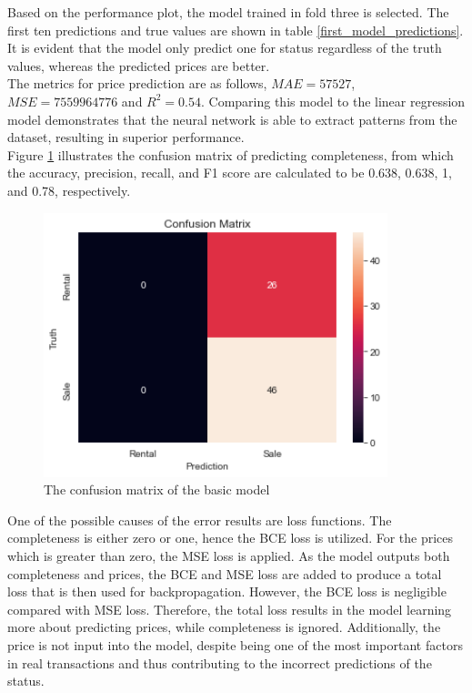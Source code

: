 \documentclass[12pt,twoside]{report}
\begin{document}
Based on the performance plot, the model trained in fold three is selected. The first ten predictions and true values are shown in table \ref{first_model_predictions}. It is evident that the model only predict one for status regardless of the truth values, whereas the predicted prices are better.  
\\

The metrics for price prediction are as follows, $MAE = 57527$, $MSE = 7559964776$ and $R^2 = 0.54$. Comparing this model to the linear regression model demonstrates that the neural network is able to extract patterns from the dataset, resulting in superior performance. 
\\

Figure \ref{confusion_matrix_basic_model} illustrates the confusion matrix of predicting completeness, from which the accuracy, precision, recall, and F1 score are calculated to be 0.638, 0.638, 1, and 0.78, respectively. 
\\

\begin{figure}[!htbp]
	\centering
	\includegraphics[width=10cm]{confusion_matrix_basic_model}
	\caption{The confusion matrix of the basic model}
	\label{confusion_matrix_basic_model}
\end{figure}

One of the possible causes of the error results are loss functions. The completeness is either zero or one, hence the BCE loss is utilized. For the prices which is greater than zero, the MSE loss is applied. As the model outputs both completeness and prices, the BCE and MSE loss are added to produce a total loss that is then used for backpropagation. However, the BCE loss is negligible compared with MSE loss. Therefore, the total loss results in the model learning more about predicting prices, while completeness is ignored. Additionally, the price is not input into the model, despite being one of the most important factors in real transactions and thus contributing to the incorrect predictions of the status.
\end{document}
